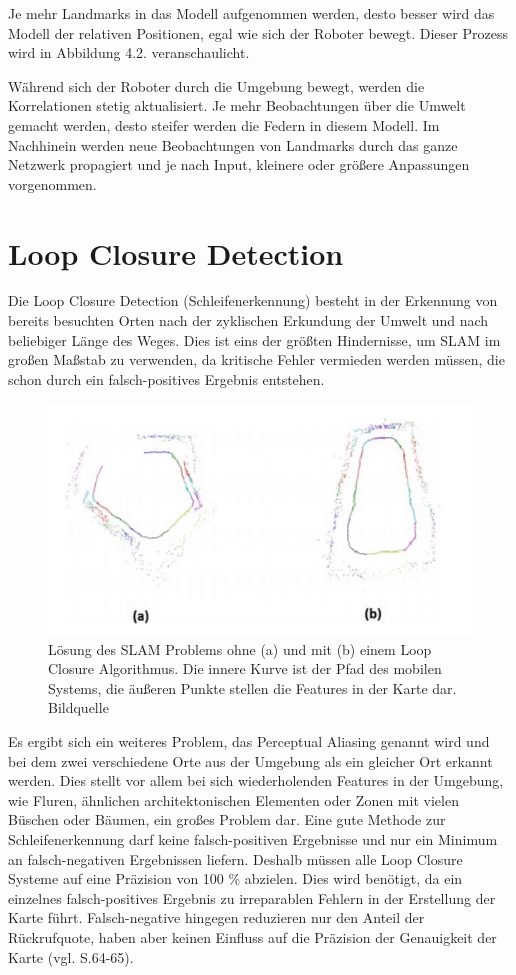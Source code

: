 Je mehr Landmarks in das Modell aufgenommen werden, desto besser wird das Modell der relativen Positionen, egal wie sich der Roboter bewegt. Dieser Prozess wird in Abbildung 4.2. veranschaulicht.

Während sich der Roboter durch die Umgebung bewegt, werden die Korrelationen stetig aktualisiert. Je mehr Beobachtungen über die Umwelt gemacht werden, desto steifer werden die Federn in diesem Modell. Im Nachhinein werden neue Beobachtungen von Landmarks durch das ganze Netzwerk propagiert und je nach Input, kleinere oder größere Anpassungen vorgenommen.

\section{Loop Closure Detection}

Die \glqq Loop Closure Detection\grqq{} (Schleifenerkennung) besteht in der Erkennung von bereits besuchten Orten nach der zyklischen Erkundung der Umwelt und nach beliebiger Länge des Weges. Dies ist eins der größten Hindernisse, um SLAM im großen Maßstab zu verwenden, da kritische Fehler vermieden werden müssen, die schon durch ein falsch-positives Ergebnis entstehen.

\begin{figure}[H]
	\centering
	\includegraphics[scale=0.53]{loop.png}
	\caption{ Lösung des SLAM Problems ohne (a) und mit (b) einem Loop Closure Algorithmus. Die innere Kurve ist der Pfad des mobilen Systems, die äußeren Punkte stellen die Features in der Karte dar. Bildquelle \cite{loop_closure}}
\end{figure}  

Es ergibt sich ein weiteres Problem, das \glqq Perceptual Aliasing\grqq{} genannt wird und bei dem zwei verschiedene Orte aus der Umgebung als ein gleicher Ort erkannt werden. Dies stellt vor allem bei sich wiederholenden Features in der Umgebung, wie Fluren, ähnlichen architektonischen Elementen oder Zonen mit vielen Büschen oder Bäumen, ein großes Problem dar. Eine gute Methode zur Schleifenerkennung darf keine falsch-positiven Ergebnisse und nur ein Minimum an falsch-negativen Ergebnissen liefern. Deshalb müssen alle Loop Closure Systeme auf eine Präzision von 100 \% abzielen. Dies wird benötigt, da ein einzelnes falsch-positives Ergebnis zu irreparablen Fehlern in der Erstellung der Karte führt. Falsch-negative hingegen reduzieren nur den Anteil der Rückrufquote, haben aber keinen Einfluss auf die Präzision der Genauigkeit der Karte (vgl. \cite{survey} S.64-65).



